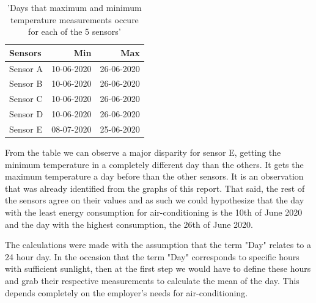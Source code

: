 \documentclass[a4paper,12pt]{article}
\begin{document}
\begin{table}[H]
\begin{center}
\begin{tabular}[\textwidth]{|l|r|r|} \hline 
\centering
    Sensors     & Min           & Max           \\\hline
    Sensor A    & 10-06-2020    & 26-06-2020    \\\hline
    Sensor B    & 10-06-2020    & 26-06-2020    \\\hline
    Sensor C    & 10-06-2020    & 26-06-2020    \\\hline
    Sensor D    & 10-06-2020    & 26-06-2020    \\\hline
    Sensor E    & 08-07-2020    & 25-06-2020    \\\hline
\end{tabular}
\caption{'Days that maximum and minimum temperature measurements occure for each of the 5 sensors'}
\end{center}
\end{table}

From the table we can observe a major disparity for sensor E, getting the minimum temperature in a completely different day than the others.
It gets the maximum temperature a day before than the other sensors. It is an observation that was already identified from the graphs of this report. 
That said, the rest of the sensors agree on their values and as such we could hypothesize that the day with the least energy consumption for air-conditioning 
is the 10th of June 2020 and the day with the highest consumption, the 26th of June 2020.


The calculations were made with the assumption that
the term "Day" relates to a 24 hour day. In the occasion that the term "Day" corresponds to specific hours with sufficient sunlight, then at the first step we would have to
define these hours and grab their respective measurements to calculate the mean of the day. This depends completely on the employer's needs for air-conditioning.




\end{document}
